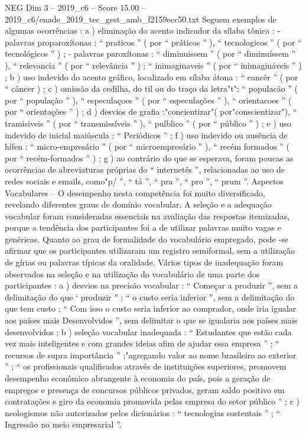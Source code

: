 \begin{textsample}{NEG Dim 3 – 2019\_c6 – Score 15.00 – 2019\_c6/enade\_2019\_tec\_gest\_amb\_f2159ecc50.txt}
Seguem exemplos de algumas ocorrências : a ) eliminação do acento indicador da sílaba tônica : - palavras proparoxítonas : “ praticos ” ( por “ práticos ” ), “ tecnologicos ” ( por “ tecnológicos ” ) ; - palavras paroxítonas : “ diminuissem ” ( por “ diminuíssem ” ), “ relevancia ” ( por “ relevância ” ) ; “ inimaginaveis ” ( por “ inimagináveis ” ) ; b ) uso indevido do acento gráfico, localizado em sílaba átona : “ cancêr ” ( por “ câncer ) ; c ) omissão da cedilha, do til ou do traço da letra"t": “ populacão ” ( por “ população ” ), “ especulaçoes ” ( por “ especulações ” ), “ orientacoes ” ( por “ orientações ” ) ; d ) desvios de grafia :"concientizar"( por"conscientizar"), “ tramisiveis ” ( por “ transmissíveis ” ), “ pulblico ” ( por “ público ” ) ; e ) uso indevido de inicial maiúscula : “ Periódicos ” ; f ) uso indevido ou ausência de hífen : “ micro-empresário ” ( por “ microempresário ” ), “ recém formados ” ( por “ recém-formados ” ) ; g ) ao contrário do que se esperava, foram poucas as ocorrências de abreviaturas próprias do “ internetês ”, relacionadas ao uso de redes sociais e emails, como"p/ ”, “ tá ”, “ pra ”, “ pro ”, “ prum ”.
Aspectos Vocabulares – O desempenho nesta competência foi muito diversificado, revelando diferentes graus de domínio vocabular.
A seleção e a adequação vocabular foram consideradas essenciais na avaliação das respostas itemizadas, porque a tendência dos participantes foi a de utilizar palavras muito vagas e genéricas.
Quanto ao grau de formalidade do vocabulário empregado, pode -se afirmar que os participantes utilizaram um registro semiformal, sem a utilização de gírias ou palavras típicas da oralidade.
Vários tipos de inadequação foram observados na seleção e na utilização do vocabulário de uma parte dos participantes : a ) desvios na precisão vocabular : “ Começar a produzir ”, sem a delimitação do que ‘ produzir ” ; “ o custo seria inferior ”, sem a delimitação do que tem custo ; “ Com isso o custo seria inferior ao comprador, onde iria igualar aos países mais Desenvolvidos ”, sem delimitar o que se igualaria aos países mais desenvolvidos ; b ) seleção vocabular inadequada : “ Estudantes que estão cada vez mais inteligentes e com grandes ideias afim de ajudar essa empresa ” ; “ recursos de supra importância ” ;"agregando valor ao nome brasileiro ao exterior ” ; “ os profissionais qualificados através de instituições superiores, promovem desempenho econômico abrangente à economia do país, pois a geração de empregos e presença de concursos públicos privados, geram saldo positivo em contratações e giro da economia promovida pelas empresa do setor público ” ; c ) neologismos não autorizados pelos dicionários : “ tecnologias sustentais ” ; “ Ingressão no meio empresarial ”.

\end{textsample}
